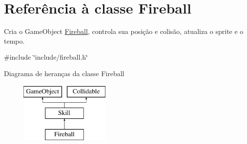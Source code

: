 \hypertarget{classFireball}{}\section{Referência à classe Fireball}
\label{classFireball}


Cria o Game\+Object \mbox{\hyperlink{classFireball}{Fireball}}, controla sua posição e colisão, atualiza o sprite e o tempo.  




{\ttfamily \#include \char`\"{}include/fireball.\+h\char`\"{}}

Diagrama de heranças da classe Fireball\begin{figure}[H]
\begin{center}
\leavevmode
\includegraphics[height=3.000000cm]{classFireball}
\end{center}
\end{figure}
